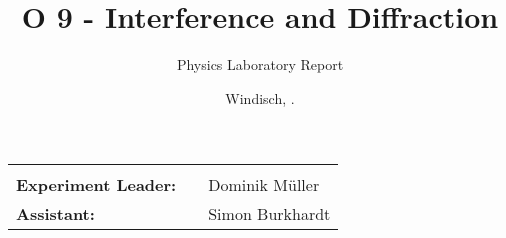 \documentclass[final]{header/fhnwreport}
\title{\textbf{{\Huge O 9 - Interference and Diffraction}}}
\author{{\Huge Physics Laboratory Report}}
\date{{\LARGE Windisch, \the\day.\MONTH \the\year}}
\begin{document}


\maketitle
\vfill
\begin{LARGE}
	\begin{tabularx}{\textwidth}{l p{0cm} X}
		\hline
		& & \\
		\textbf{Experiment Leader:} & & Dominik Müller \\
		\textbf{Assistant:} & & Simon Burkhardt \\
	\end{tabularx}
\end{LARGE}
\clearpage

\tableofcontents
\clearpage







\printbibliography[heading=bibintoc]
\label{sec:literature}

\printglossaries



\ifdraft{
	\newpage
	\listoftodos[\section{To-Do}]
	\clearpage
}
{
}
\end{document}
